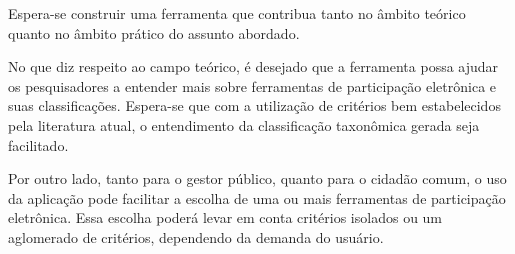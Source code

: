 Espera-se construir uma ferramenta que contribua tanto no âmbito teórico quanto no âmbito prático do assunto abordado. 
\par
No que diz respeito ao campo teórico, é desejado que a ferramenta possa ajudar os pesquisadores a entender mais sobre ferramentas de participação eletrônica e suas classificações. 
Espera-se que com a utilização de critérios bem estabelecidos pela literatura atual, o entendimento da classificação taxonômica gerada seja facilitado.
\par
Por outro lado, tanto para o gestor público, quanto para o cidadão comum, o uso da aplicação pode facilitar a escolha de uma ou mais ferramentas de participação
eletrônica. Essa escolha poderá levar em conta critérios isolados ou um aglomerado de critérios, dependendo da demanda do usuário.
